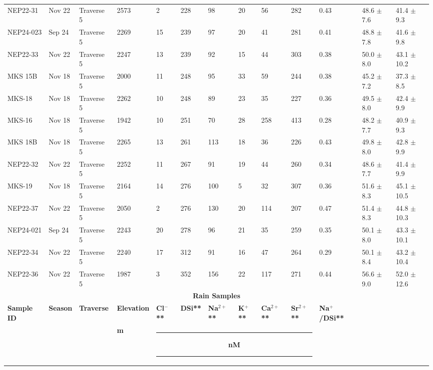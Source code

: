 \begin{landscape}
{\begin{longtable}{l l l l l l l l l l l l l}
    NEP22-31 & Nov 22 & Traverse 5 & 2573 & 2 & 228 & 98 & 20 & 56 & 282 & 0.43 & 48.6 $\pm$ 7.6 & 41.4 $\pm$ 9.3 \\
    NEP24-023 & Sep 24 & Traverse 5 & 2269 & 15 & 239 & 97 & 20 & 41 & 281 & 0.41 & 48.8 $\pm$ 7.8 & 41.6 $\pm$ 9.8 \\
    NEP22-33 & Nov 22 & Traverse 5 & 2247 & 13 & 239 & 92 & 15 & 44 & 303 & 0.38 & 50.0 $\pm$ 8.0 & 43.1 $\pm$ 10.2 \\
    MKS 15B & Nov 18 & Traverse 5 & 2000 & 11 & 248 & 95 & 33 & 59 & 244 & 0.38 & 45.2 $\pm$ 7.2 & 37.3 $\pm$ 8.5 \\
    MKS-18 & Nov 18 & Traverse 5 & 2262 & 10 & 248 & 89 & 23 & 35 & 227 & 0.36 & 49.5 $\pm$ 8.0 & 42.4 $\pm$ 9.9 \\
    MKS-16 & Nov 18 & Traverse 5 & 1942 & 10 & 251 & 70 & 28 & 258 & 413 & 0.28 & 48.2 $\pm$ 7.7 & 40.9 $\pm$ 9.3 \\
    MKS 18B & Nov 18 & Traverse 5 & 2265 & 13 & 261 & 113 & 18 & 36 & 226 & 0.43 & 49.8 $\pm$ 8.0 & 42.8 $\pm$ 9.9 \\
    NEP22-32 & Nov 22 & Traverse 5 & 2252 & 11 & 267 & 91 & 19 & 44 & 260 & 0.34 & 48.6 $\pm$ 7.7 & 41.4 $\pm$ 9.9 \\
    MKS-19 & Nov 18 & Traverse 5 & 2164 & 14 & 276 & 100 & 5 & 32 & 307 & 0.36 & 51.6 $\pm$ 8.3 & 45.1 $\pm$ 10.5 \\
    NEP22-37 & Nov 22 & Traverse 5 & 2050 & 2 & 276 & 130 & 20 & 114 & 207 & 0.47 & 51.4 $\pm$ 8.3 & 44.8 $\pm$ 10.3 \\
    NEP24-021 & Sep 24 & Traverse 5 & 2243 & 20 & 278 & 96 & 21 & 35 & 259 & 0.35 & 50.1 $\pm$ 8.0 & 43.3 $\pm$ 10.1 \\
    NEP22-34 & Nov 22 & Traverse 5 & 2240 & 17 & 312 & 91 & 16 & 47 & 264 & 0.29 & 50.1 $\pm$ 8.4 & 43.2 $\pm$ 10.4 \\
    NEP22-36 & Nov 22 & Traverse 5 & 1987 & 3 & 352 & 156 & 22 & 117 & 271 & 0.44 & 56.6 $\pm$ 9.0 & 52.0 $\pm$ 12.6 \\
    \hline
    \hline
    \multicolumn{13}{c}{\textbf{Rain Samples}} \\
    \hline
    \textbf{Sample ID}  &  \textbf{Season}  &  \textbf{Traverse}  &  \textbf{Elevation}  &  \textbf{Cl$^-$**}  &  \textbf{DSi**}  &  \textbf{Na$^{2+}$**}  &  \textbf{K$^{+}$**}  &  \textbf{Ca$^{2+}$**}  &  \textbf{Sr$^{2+}$**}  &  \textbf{Na$^{+}$/DSi**}  &  \phantom{T$_{Fontorbe} \pm 1\sigma$}  &  \phantom{T$_{Maher} \pm 1\sigma$} \\
    \hline
      &   &   &  \textbf{m}  &  \multicolumn{6}{c}{\hspace{-0.35cm}\rule{3.2cm}{0.8pt} \hspace{0.3cm}\textbf{ nM } \hspace{0.3cm} \rule{3.2cm}{0.8pt}} &  &  & \\

\end{longtable}}
\end{landscape}
